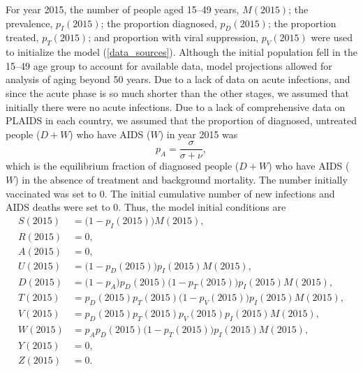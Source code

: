 \documentclass{article}
\begin{document}
For year 2015, the number of people aged 15--49 years, $M(2015)$; the
prevalence, $p_I(2015)$; the proportion diagnosed, $p_D(2015)$; the
proportion treated, $p_T(2015)$; and proportion with viral
suppression, $p_V(2015)$ were used to initialize the model
(\autoref{data_sources}). Although the initial population fell in the 15--49 age group
to account for available data, model projections allowed for analysis of aging beyond 50 years.
Due to a lack of data on acute infections,
and since the acute phase is so much shorter than the other stages, we
assumed that initially there were no acute infections.  Due to a lack
of comprehensive data on PLAIDS in each country, we assumed that the
proportion of diagnosed, untreated people ($D + W$) who have AIDS
($W$) in year 2015 was
\begin{equation}
  p_A = \frac{\sigma}{\sigma + \nu},
\end{equation}
which is the equilibrium fraction of diagnosed people ($D + W$) who
have AIDS ($W$) in the absence of treatment and background mortality.
The number initially vaccinated was set to 0.  The initial cumulative
number of new infections and AIDS deaths were set to 0.  Thus, the
model initial conditions are
\begin{equation}
  \label{initial_conditions}
  \begin{split}
    S(2015) &= \big(1 - p_I(2015)\big) M(2015), \\
    R(2015) &= 0, \\
    A(2015) &= 0, \\
    U(2015) &= \big(1 - p_D(2015)\big) p_I(2015) M(2015), \\
    D(2015) &= \big(1 - p_A\big) p_D(2015) \big(1 - p_T(2015)\big)
    p_I(2015) M(2015), \\
    T(2015) &= p_D(2015) p_T(2015) \big(1 - p_V(2015)\big)
    p_I(2015) M(2015), \\
    V(2015) &= p_D(2015) p_T(2015) p_V(2015) p_I(2015) M(2015), \\
    W(2015) &= p_A p_D(2015) \big(1 - p_T(2015)\big) p_I(2015) M(2015), \\
    Y(2015) &= 0, \\
    Z(2015) &= 0.
  \end{split}
\end{equation}
\end{document}
